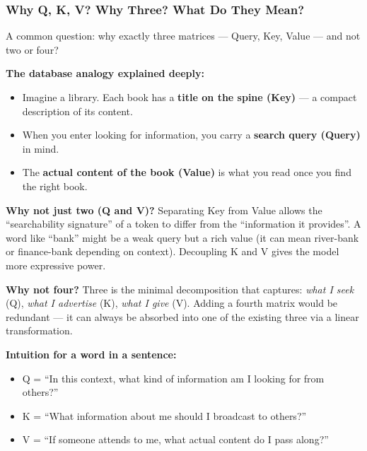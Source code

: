 \begin{frame}[fragile]\frametitle{Why Q, K, V? Why Three? What Do They Mean?}

A common question: why exactly three matrices --- Query, Key, Value --- and not two or four?

\textbf{The database analogy explained deeply:}
\begin{itemize}
\item Imagine a library. Each book has a \textbf{title on the spine (Key)} --- a compact description of its content.
\item When you enter looking for information, you carry a \textbf{search query (Query)} in mind.
\item The \textbf{actual content of the book (Value)} is what you read once you find the right book.
\end{itemize}

\textbf{Why not just two (Q and V)?}
Separating Key from Value allows the ``searchability signature'' of a token to differ from the ``information it provides''. A word like ``bank'' might be a weak query but a rich value (it can mean river-bank or finance-bank depending on context). Decoupling K and V gives the model more expressive power.

\textbf{Why not four?}
Three is the minimal decomposition that captures: \emph{what I seek} (Q), \emph{what I advertise} (K), \emph{what I give} (V). Adding a fourth matrix would be redundant --- it can always be absorbed into one of the existing three via a linear transformation.

\textbf{Intuition for a word in a sentence:}
\begin{itemize}
\item Q = ``In this context, what kind of information am I looking for from others?''
\item K = ``What information about me should I broadcast to others?''
\item V = ``If someone attends to me, what actual content do I pass along?''
\end{itemize}

\end{frame}


